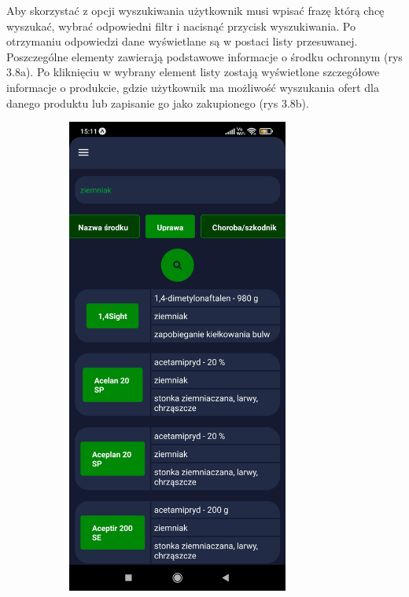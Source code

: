 \documentclass[a4paper,12pt,oneside]{book}
\begin{document}
		Aby skorzystać z opcji wyszukiwania użytkownik musi wpisać frazę którą chcę wyszukać, wybrać odpowiedni filtr i nacisnąć przycisk wyszukiwania. Po otrzymaniu odpowiedzi dane wyświetlane są w postaci listy przesuwanej. Poszczególne elementy zawierają podstawowe informacje o środku ochronnym (rys 3.8a). Po kliknięciu w wybrany element listy zostają wyświetlone szczegółowe informacje o produkcie, gdzie użytkownik ma możliwość wyszukania ofert dla danego produktu lub zapisanie go jako zakupionego (rys 3.8b).
		
		\begin{figure}[H]
			\centering
			\begin{subfigure}{.5\textwidth}
				\centering
				\includegraphics[width=0.8\textwidth]{grafika/wysz_a.jpg}

\end{subfigure}
\end{figure}
\end{document}
